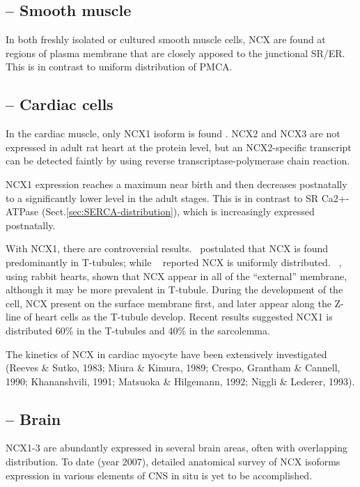 \subsection{-- Smooth muscle}
\label{sec:NCX-distribution-smooth-muscle}

In both freshly isolated or cultured smooth muscle cells, NCX are
found at regions of plasma membrane that are closely apposed to the
junctional SR/ER. This is in contrast to uniform distribution of
PMCA. 

\subsection{-- Cardiac cells}
\label{sec:NCX-distribution-cardiac-cells}

In the cardiac muscle, only NCX1 isoform is found \citep{shigekawa2001,
minelli2007}. NCX2 and NCX3 are not expressed in adult rat heart at the protein
level, but an NCX2-specific transcript can be detected faintly by using reverse
transcriptase-polymerase chain reaction.

NCX1 expression reaches a maximum near birth and then decreases postnatally to a
significantly lower level in the adult stages. This is in contrast to SR
Ca2+-ATPase (Sect.\ref{sec:SERCA-distribution}), which is increasingly expressed
postnatally.

With NCX1, there are controversial results.~\citep{frank1992} postulated that
NCX is found predominantly in T-tubules; while ~\citep{kieval1992} reported NCX
is uniformly distributed. ~\citep{chen1995}, using rabbit hearts, shown that NCX
appear in all of the ``external'' membrane, although it may be more prevalent in
T-tubule. During the development of the cell, NCX present on the surface
membrane first, and later appear along the Z-line of heart cells as the T-tubule
develop. Recent results suggested NCX1 is distributed 60\% in the T-tubules and
40\% in the sarcolemma.

The kinetics of NCX in cardiac myocyte have been extensively investigated
(Reeves \& Sutko, 1983; Miura \& Kimura, 1989; Crespo, Grantham \& Cannell, 1990;
Khananshvili, 1991; Matsuoka \& Hilgemann, 1992; Niggli \& Lederer, 1993).

\subsection{-- Brain}
\label{sec:NCX-brain}

NCX1-3 are abundantly expressed in several brain areas, often with overlapping
distribution. To date (year 2007), detailed anatomical survey of NCX isoforms
expression in various elements of CNS in situ is yet to be accomplished.



